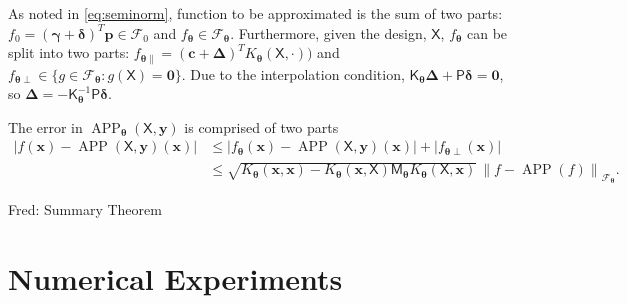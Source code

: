 \documentclass[]{mcom-l}
\theoremstyle{remark}
\DeclareMathOperator{\APP}{APP}
\newcommand{\mK}{\mathsf{K}}
\newcommand{\mM}{\mathsf{M}}
\newcommand{\mP}{\mathsf{P}}
\newcommand{\mX}{\mathsf{X}}
\newcommand{\bzero}{\boldsymbol{0}}
\newcommand{\bc}{{\boldsymbol{c}}}
\newcommand{\bx}{{\boldsymbol{x}}}
\newcommand{\bp}{{\boldsymbol{p}}}
\newcommand{\by}{{\boldsymbol{y}}}
\newcommand{\bgamma}{{\boldsymbol{\gamma}}}
\newcommand{\bdelta}{{\boldsymbol{\delta}}}
\newcommand{\bDelta}{{\boldsymbol{\Delta}}}
\newcommand{\btheta}{{\boldsymbol{\theta}}}
\newcommand{\calf}{{\mathcal{F}}}
\def\abs#1{\ensuremath{\left \lvert #1 \right \rvert}}
\newcommand{\bignorm}[2][{}]{\ensuremath{\bigl \lVert #2 \bigr \rVert}_{#1}}
\newcommand{\FredNote}[1]{{\color{blue}Fred: #1}}
\begin{document}
As noted in  \eqref{eq:seminorm}, function to be approximated is the sum of two parts: $f_0 = (\bgamma + \bdelta)^T \bp \in \calf_0$ and $f_\btheta \in \calf_\btheta$.  Furthermore, given the design, $\mX$, $f_\btheta$ can be split into two parts: $f_{\btheta\parallel} = (\bc + \bDelta)^T K_\btheta(\mX,\cdot) )$ and $f_{\btheta\perp} \in \{g \in \calf_\btheta : g(\mX) = \bzero\}$.  Due to the interpolation condition, $\mK_\btheta \bDelta  + \mP \bdelta = \bzero$, so $\bDelta = - \mK_\btheta^{-1} \mP \bdelta$.

The error in $\APP_\btheta(\mX,\by)$ is comprised of two parts
\begin{align}
\label{eq:RKHSErrBdP}
\abs{f(\bx) - \APP(\mX,\by)(\bx)} 
& \le \abs{ f_\btheta(\bx) - \APP(\mX,\by)(\bx)} + \abs{f_{\btheta\perp}(\bx)} 
\\
&\le \sqrt{K_\btheta(\bx,\bx) - K_\btheta(\bx,\mX) \mM_\btheta K_\btheta(\mX,\bx)} \, \bignorm[\calf_\btheta]{f - \APP(f)}.
\end{align}







\FredNote{Summary Theorem}
\section{Numerical Experiments}




\end{document}

